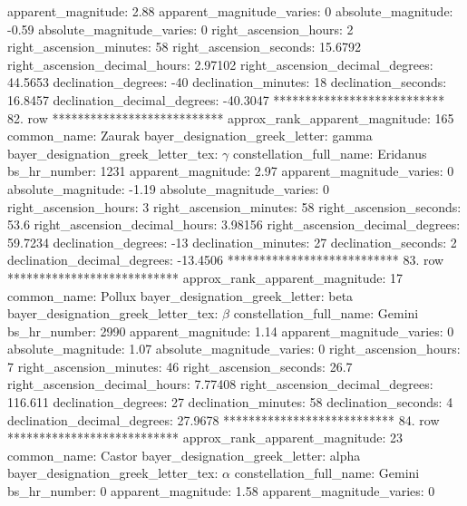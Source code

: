                 apparent_magnitude: 2.88
         apparent_magnitude_varies: 0
                absolute_magnitude: -0.59
         absolute_magnitude_varies: 0
             right_ascension_hours: 2
           right_ascension_minutes: 58
           right_ascension_seconds: 15.6792
     right_ascension_decimal_hours: 2.97102
   right_ascension_decimal_degrees: 44.5653
               declination_degrees: -40
               declination_minutes: 18
               declination_seconds: 16.8457
       declination_decimal_degrees: -40.3047
*************************** 82. row ***************************
    approx_rank_apparent_magnitude: 165
                       common_name: Zaurak
    bayer_designation_greek_letter: gamma
bayer_designation_greek_letter_tex: $\gamma$
           constellation_full_name: Eridanus
                      bs_hr_number: 1231
                apparent_magnitude: 2.97
         apparent_magnitude_varies: 0
                absolute_magnitude: -1.19
         absolute_magnitude_varies: 0
             right_ascension_hours: 3
           right_ascension_minutes: 58
           right_ascension_seconds: 53.6
     right_ascension_decimal_hours: 3.98156
   right_ascension_decimal_degrees: 59.7234
               declination_degrees: -13
               declination_minutes: 27
               declination_seconds: 2
       declination_decimal_degrees: -13.4506
*************************** 83. row ***************************
    approx_rank_apparent_magnitude: 17
                       common_name: Pollux
    bayer_designation_greek_letter: beta
bayer_designation_greek_letter_tex: $\beta$
           constellation_full_name: Gemini
                      bs_hr_number: 2990
                apparent_magnitude: 1.14
         apparent_magnitude_varies: 0
                absolute_magnitude: 1.07
         absolute_magnitude_varies: 0
             right_ascension_hours: 7
           right_ascension_minutes: 46
           right_ascension_seconds: 26.7
     right_ascension_decimal_hours: 7.77408
   right_ascension_decimal_degrees: 116.611
               declination_degrees: 27
               declination_minutes: 58
               declination_seconds: 4
       declination_decimal_degrees: 27.9678
*************************** 84. row ***************************
    approx_rank_apparent_magnitude: 23
                       common_name: Castor
    bayer_designation_greek_letter: alpha
bayer_designation_greek_letter_tex: $\alpha$
           constellation_full_name: Gemini
                      bs_hr_number: 0
                apparent_magnitude: 1.58
         apparent_magnitude_varies: 0
